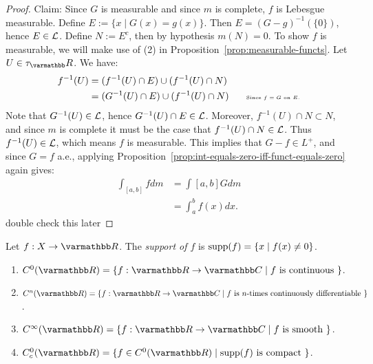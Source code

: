 \begin{proof}
        Claim: Since $G$ is measurable and since $m$ is complete, $f$ is Lebesgue measurable. Define $E:= \{x \mid G(x) = g(x)\}$. Then $E = (G-g)^{-1}(\{0\})$, hence $E \in \mathcal{L}$. Define $N := E^c$, then by hypothesis $m(N) = 0$. To show $f$ is measurable, we will make use of (2) in Proposition~\ref{prop:measurable-functs}. Let $U \in \tau_\bfR$. We have:
            \begin{equation*}
            \begin{split}
                f^{-1}(U) 
                & = (f^{-1}(U) \cap E) \cup (f^{-1}(U) \cap N) \\
                & = (G^{-1}(U) \cap E) \cup (f^{-1}(U) \cap N) \h9\h9\text{\tiny Since $f = G$ on $E$.}
            \end{split}
            \end{equation*}
        Note that $G^{-1}(U) \in \mathcal{L}$, hence $G^{-1}(U) \cap E \in \mathcal{L}$. Moreover, $f^{-1}(U) \cap N \subset N$, and since $m$ is complete it must be the case that $f^{-1}(U) \cap N \in \mathcal{L}$. Thus $f^{-1}(U) \in \mathcal{L}$, which means $f$ is measurable. This implies that $G - f \in L^+$, and since $G = f$ a.e., applying Proposition~\ref{prop:int-equals-zero-iff-funct-equals-zero} again gives:
            \begin{equation*}
            \begin{split}
                \int_{[a,b]}fdm 
                & = \int {[a,b]}Gdm  \\
                & = \int_a^b f(x)dx.
            \end{split}
            \end{equation*}
        {\color{red} double check this later}
    \end{proof}

    \begin{center}
    \end{center}
\begin{definition}
    Let $f:X \rightarrow \bfR$. The \textit{support of $f$} is $\operatorname{supp}(f) = \{x \mid f(x) \neq 0\}$.
\end{definition}

\begin{definition}
    \phantom{a}
    \begin{enumerate}[label = (\arabic*),itemsep=1pt,topsep=3pt]
        \item $C^0(\bfR) = \{f:\bfR \rightarrow \bfC \mid f \text{ is continuous }\}$.
        \item $C^n(\bfR) = \{f:\bfR \rightarrow \bfC \mid f \text{ is $n$-times continuously differentiable }\}$.
        \item $C^\infty(\bfR) = \{f:\bfR \rightarrow \bfC \mid f \text{ is smooth }\}$.
        \item $C_c^0(\bfR) = \{f \in C^0(\bfR) \mid \supp(f) \text{ is compact }\}$.
    \end{enumerate}
\end{definition}

